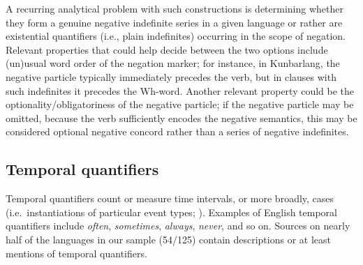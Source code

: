 \documentclass[12pt,egregdoesnotlikesansseriftitles]{scrartcl}
\newcommand{\ofy}{/125} %
\begin{document}
A recurring analytical problem with such constructions is determining whether they form a genuine negative indefinite series in a given language or rather are existential quantifiers (i.e., plain indefinites) occurring in the scope of negation. Relevant properties that could help decide between the two options include (un)usual word order of the negation marker; for instance, in Kunbarlang, the negative particle typically immediately precedes the verb, but in clauses with such indefinites it precedes the Wh-word. Another relevant property could be the optionality/obligatoriness of the negative particle; if the negative particle may be omitted, because the verb sufficiently encodes the negative semantics, this may be considered optional negative concord rather than a series of negative indefinites.

\subsection{Temporal quantifiers}
\label{sec:tempq}
Temporal quantifiers count or measure time intervals, or more broadly, cases (i.e.\ instantiations of particular event types; \citealt{lewis75}). Examples of English temporal quantifiers include \textit{often}, \textit{sometimes}, \textit{always}, \textit{never}, and so on.  Sources on nearly half of the languages in our sample (54\ofy) contain descriptions or at least mentions of temporal quantifiers. 
\end{document}
